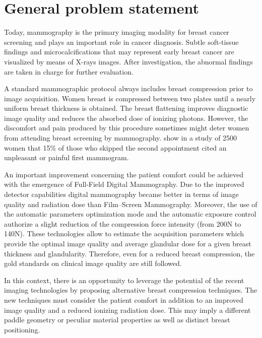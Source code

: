 \chapter*{General problem statement}
\label{section:generalproblemstatment}

Today, mammography is the primary imaging modality for breast cancer screening and plays an important role in cancer diagnosis. Subtle soft-tissue findings and microcalcifications that may represent early breast cancer are visualized by means of X-rays images. After investigation, the abnormal findings are taken in charge for further evaluation.  

A standard mammographic protocol always includes breast compression prior to image acquisition. Women breast is compressed between two plates until a nearly uniform breast thickness is obtained. The breast flattening improves diagnostic image quality and reduces the absorbed dose of ionizing photons. However, the discomfort and pain produced by this procedure sometimes might deter women from attending breast screening by mammography. \cite{fleming_intermittent_2013} show in a study of 2500 women that 15\% of those who skipped the second appointment cited an unpleasant or painful first mammogram.  

An important improvement concerning the patient comfort could be achieved with the emergence of Full-Field Digital Mammography. Due to the improved detector capabilities digital mammography became better in terms of image quality and radiation dose than Film–Screen Mammography. Moreover, the use of the automatic parameters optimization mode and the automatic exposure control authorize a slight reduction of the compression force intensity (from 200N to 140N). These technologies allow to estimate the acquisition parameters which provide the optimal image quality and average glandular dose for a given breast thickness and glandularity. Therefore, even for a reduced breast compression, the gold standards on clinical image quality are still followed.

In this context, there is an opportunity to leverage the potential of the recent imaging technologies by proposing alternative breast compression techniques. The new techniques must consider the patient comfort in addition to an improved image quality and a reduced ionizing radiation dose. This may imply a different paddle geometry or peculiar material properties as well as distinct breast positioning.

